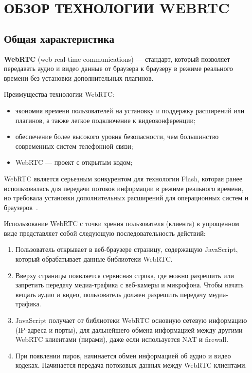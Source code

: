 \section[Обзор технологии WebRTC]{%
  ОБЗОР ТЕХНОЛОГИИ WEBRTC
}
\label{sec:webrtc}

\subsection{Общая характеристика}
\label{ssec:webrtc_overview}

\textbf{WebRTC} (web real-time communications) --- стандарт, 
который позволяет передавать аудио и видео данные от браузера к браузеру
в режиме реального времени без установки дополнительных плагинов.

Преимущества технологии WebRTC:
\begin{itemize}
\item экономия времени пользователей на установку и поддержку расширений или плагинов,
  а также легкое подключение к видеоконференции;
\item обеспечение более высокого уровня безопасности, чем большинство современных систем
  телефонной связи;
\item WebRTC --- проект с открытым кодом;
\end{itemize}

WebRTC является серьезным конкурентом для технологии Flash,
которая ранее использовалась для передачи потоков информации в режиме реального времени,
но требовала установки дополнительных расширений для операционных систем и браузеров~\cite{webrtc_rus}.

Использование WebRTC с точки зрения пользователя (клиента) в упрощенном виде 
представляет собой следующую последовательность действий:
\begin{enumerate}
\item Пользователь открывает в веб-браузере страницу, содержащую JavaScript,
  который обрабатывает данные библиотеки WebRTC.
\item Вверху страницы появляется сервисная строка, где можно разрешить или
  запретить передачу медиа-трафика с веб-камеры и микрофона. 
  Чтобы начать вещать аудио и видео, пользователь должен разрешить передачу медиа-трафика.
\item JavaScript получает от библиотеки WebRTC основную сетевую информацию 
  (IP-адреса и порты), для дальнейшего обмена информацией между другими WebRTC клиентами
  (пирами), даже если используется NAT и firewall.
\item При появлении пиров, начинается обмен информацией об аудио и видео кодеках.
  Начинается передача потоковых данных между WebRTC клиентами.
\end{enumerate}

